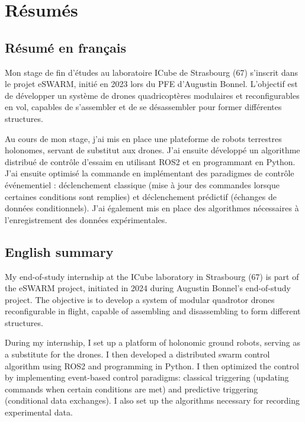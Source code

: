 \chapter*{Résumés}

\section*{Résumé en français}
Mon stage de fin d’études au laboratoire ICube de Strasbourg (67) s’inscrit dans le projet eSWARM, initié en 2023 lors du PFE d’Augustin Bonnel. L’objectif est de développer un système de drones quadricoptères modulaires et reconfigurables en vol, capables de s’assembler et de se désassembler pour former différentes structures.

Au cours de mon stage, j’ai mis en place une plateforme de robots terrestres holonomes, servant de substitut aux drones. J’ai ensuite développé un algorithme distribué de contrôle d’essaim en utilisant ROS2 et en programmant en Python. J'ai ensuite optimisé la commande en implémentant des paradigmes de contrôle événementiel : déclenchement classique (mise à jour des commandes lorsque certaines conditions sont remplies) et déclenchement prédictif (échanges de données conditionnels). 
J’ai également mis en place des algorithmes nécessaires à l’enregistrement des données expérimentales.

\section*{English summary}
My end-of-study internship at the ICube laboratory in Strasbourg (67) is part of the eSWARM project, initiated in 2024 during Augustin Bonnel’s end-of-study project. The objective is to develop a system of modular quadrotor drones reconfigurable in flight, capable of assembling and disassembling to form different structures.

During my internship, I set up a platform of holonomic ground robots, serving as a substitute for the drones. I then developed a distributed swarm control algorithm using ROS2 and programming in Python. I then optimized the control by implementing event-based control paradigms: classical triggering (updating commands when certain conditions are met) and predictive triggering (conditional data exchanges). I also set up the algorithms necessary for recording experimental data.

